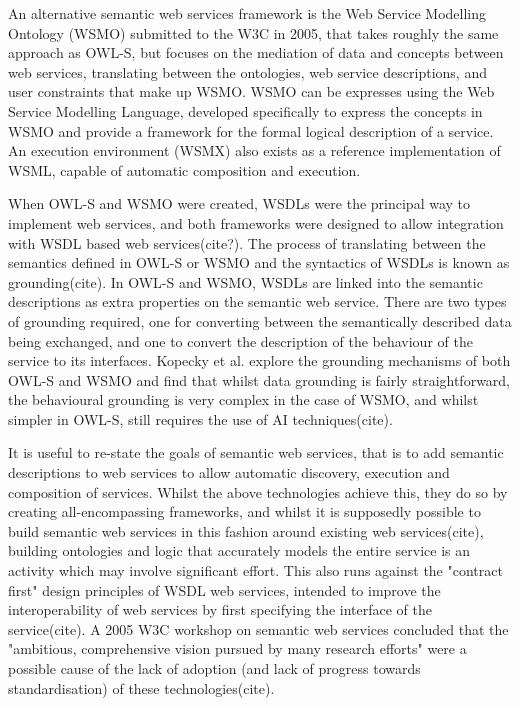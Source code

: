 An alternative semantic web services framework is the Web Service Modelling
Ontology (WSMO) submitted to the W3C in 2005, that takes roughly the same
approach as OWL-S, but focuses on the mediation of data and concepts between
web services, translating between the ontologies, web service descriptions, and
user constraints that make up WSMO. WSMO can be expresses using the Web Service
Modelling Language, developed specifically to express the concepts in WSMO and
provide a framework for the formal logical description of a service. An
execution environment (WSMX) also exists as a reference implementation of WSML,
capable of automatic composition and execution.

When OWL-S and WSMO were created, WSDLs were the principal way to implement web
services, and both frameworks were designed to allow integration with WSDL based
web services(cite?). The process of translating between the semantics defined
in OWL-S or WSMO and the syntactics of WSDLs is known as grounding(cite). In
OWL-S and WSMO, WSDLs are linked into the semantic descriptions as extra
properties on the semantic web service. There are two types of grounding
required, one for converting between the semantically described data being
exchanged, and one to convert the description of the behaviour of the service to
its interfaces. Kopecky et al. explore the grounding mechanisms of both OWL-S
and WSMO and find that whilst data grounding is fairly straightforward, the
behavioural grounding is very complex in the case of WSMO, and whilst simpler in
OWL-S, still requires the use of AI techniques(cite).

It is useful to re-state the goals of semantic web services, that is to add
semantic descriptions to web services to allow automatic discovery, execution
and composition of services. Whilst the above technologies achieve this, they do
so by creating all-encompassing frameworks, and whilst it is supposedly
possible to build semantic web services in this fashion around existing web
services(cite), building ontologies and logic that accurately models the entire
service is an activity which may involve significant effort. This also runs
against the "contract first" design principles of WSDL web services, intended to
improve the interoperability of web services by first specifying the interface
of the service(cite). A 2005 W3C workshop on semantic web services concluded that the
"ambitious, comprehensive vision pursued by many research efforts" were a
possible cause of the lack of adoption (and lack of progress towards
standardisation) of these technologies(cite). 


